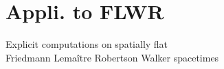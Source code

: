 \documentclass[9pt]{beamer}
\begin{document}



\section{Appli. to FLWR}


{
 
 \begin{frame}
\bf
 \begin{exampleblock}{\vspace*{-3ex}}
 \begin{center}
 \Large Explicit computations on spatially flat \\[10pt] Friedmann Lemaître Robertson Walker spacetimes
 \end{center}
 \end{exampleblock}

\end{frame}

}

\end{document}
